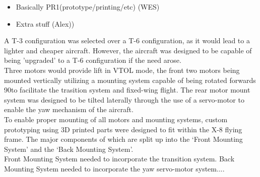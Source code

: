 \color{red}
\begin{itemize}
\item Basically PR1(prototype/printing/etc) (WES)
\item Extra stuff (Alex))
\end{itemize}
\color{black}

A T-3 configuration was selected over a T-6 configuration, as it would lead to a lighter and cheaper aircraft. However, the aircraft was designed to be capable of being 'upgraded' to a T-6 configuration if the need arose.\\
Three motors would provide lift in VTOL mode, the front two motors being mounted vertically utilizing a mounting system capable of being rotated forwards 90\degree to facilitate the trasition system and fixed-wing flight. The rear motor mount system was designed to be tilted laterally through the use of a servo-motor to enable the yaw mechanism of the aircraft.\\
To enable proper mounting of all motors and mounting systems, custom prototyping using 3D printed parts were designed to fit within the X-8 flying frame. The major components of which are split up into the `Front  Mounting System' and the `Back Mounting System'.\\
Front Mounting System needed to incorporate the transition system.
Back Mounting System needed to incorporate the yaw servo-motor system....
